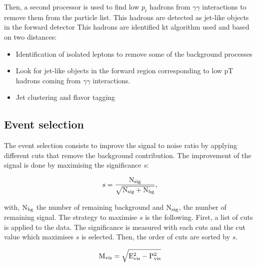     Then, a second processor is used to find low $p_{t}$ hadrons from $\gamma \gamma$ interactions to remove them from the particle list. 
    This hadrons are detected as jet-like objects in the forward detector
    This hadrons are identified 
    kt algorithm used and based on two distances: 
   
    \begin{itemize}
      \item Identification of isolated leptons to remove some of the background processes
      \item Look for jet-like objects in the forward region corresponding to low pT hadrons coming from $\gamma \gamma$ interactions.
      \item Jet clustering and flavor tagging
    \end{itemize}

  \subsection{Event selection}

  The event selection consists to improve the signal to noise ratio by applying different cuts that remove the background contribution.
  The improvement of the signal is done by maximising the significance $s$:

  \begin{equation}
    s = \frac{\rm{N_{sig}}}{\sqrt{\rm{N_{sig}}+ \rm{N_{bg}}}},
  \end{equation}

  with, $\rm{N_{bg}}$ the number of remaining background and $\rm{N_{sig}}$, the number of remaining signal.
  The strategy to maximise $s$ is the following.
  First, a list of cuts is applied to the data.
  The significance is measured with each cuts and the cut value which maximises $s$ is selected.
  Then, the order of cuts are sorted by $s$.

  \begin{equation}
   \rm{M_{vis}} = \sqrt{E^2_{vis} - P^2_{vis}}
  \end{equation}

